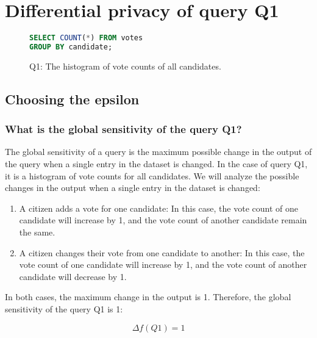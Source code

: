 

\newpage


\section{Differential privacy of query Q1}

\begin{figure}[ht]
  \begin{lstlisting}[language=sql,label={lst:lstlisting}]
SELECT COUNT(*) FROM votes
GROUP BY candidate;
  \end{lstlisting}
  \caption{Q1: The histogram of vote counts of all candidates.}
  \label{fig:histogramQ1}
\end{figure}

\subsection{Choosing the epsilon}\label{subsec:choosing-the-epsilon}

\subsubsection{What is the global sensitivity of the query Q1?}

The global sensitivity of a query is the maximum possible change in the output of the query when a single entry in the dataset is changed. In the case of query Q1, it is a histogram of vote counts for all candidates. We will analyze the possible changes in the output when a single entry in the dataset is changed:

\begin{enumerate}
  \item A citizen adds a vote for one candidate: In this case, the vote count of one candidate will increase by 1, and
  the vote count of another candidate remain the same.
  \item A citizen changes their vote from one candidate to another: In this case, the vote count of one candidate will increase by 1, and the vote count of another candidate will decrease by 1.
\end{enumerate}

In both cases, the maximum change in the output is 1. Therefore, the global sensitivity of the query Q1 is 1:

\begin{equation}
  \Delta f(Q1) = 1
\end{equation}



